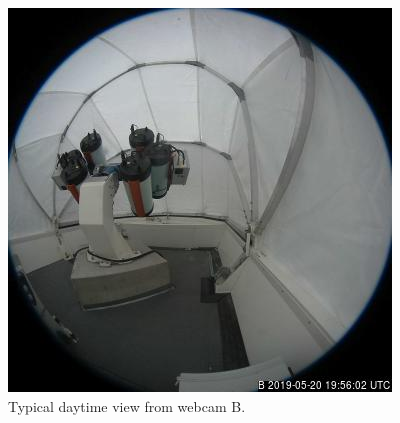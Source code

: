 \begin{figure}[t]
\begin{center}
\fi
\ifddoti
\includegraphics[height=0.6\linewidth]{figures/ddoti-webcam-b.jpg}
\fi
\end{center}
\caption{Typical daytime view from {\projectname} webcam B.}
\label{figure:webcam-b-view}
\end{figure}

